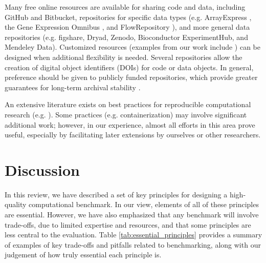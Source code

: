 Many free online resources are available for sharing code and data, including GitHub and Bitbucket, repositories for specific data types (e.g. ArrayExpress \cite{kolesnikov_arrayexpressupdatesimplifying_2015}, the Gene Expression Omnibus \cite{barrett_ncbigeoarchive_2013}, and FlowRepository \cite{spidlen_flowrepositoryresourceannotated_2012}), and more general data repositories (e.g. figshare, Dryad, Zenodo, Bioconductor ExperimentHub, and Mendeley Data). Customized resources (examples from our work include \cite{soneson_biasrobustnessscalability_2018, soneson_icobraopenreproducible_2016}) can be designed when additional flexibility is needed. Several repositories allow the creation of digital object identifiers (DOIs) for code or data objects. In general, preference should be given to publicly funded repositories, which provide greater guarantees for long-term archival stability \cite{mangul_improvingusabilityarchival_2019,mangul_challengesrecommendationsimprove_2019}.

An extensive literature exists on best practices for reproducible computational research (e.g. \cite{sandve_tensimplerules_2013}). Some practices (e.g. containerization) may involve significant additional work; however, in our experience, almost all efforts in this area prove useful, especially by facilitating later extensions by ourselves or other researchers.

\section{Discussion}
In this review, we have described a set of key principles for designing a high-quality computational benchmark. In our view, elements of all of these principles are essential. However, we have also emphasized that any benchmark will involve trade-offs, due to limited expertise and resources, and that some principles are less central to the evaluation. Table \ref{tab:essential_principles} provides a summary of examples of key trade-offs and pitfalls related to benchmarking, along with our judgement of how truly essential each principle is.

\newcommand{\mycola}[2][1]{\multirow{#1}{3.5cm}{#2}}
\newcommand{\mycolb}[2][1]{\multirow{#1}{3.5cm}{#2}}

